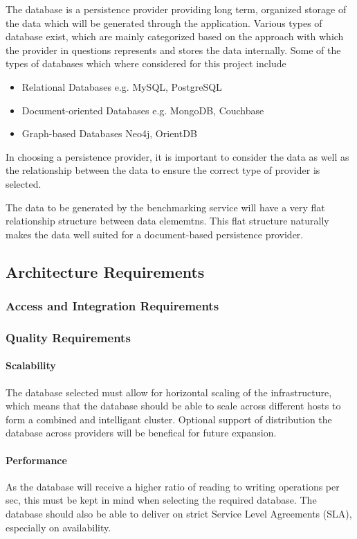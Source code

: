 The database is a persistence provider providing long term, organized storage
of the data which will be generated through the application. Various types of
database exist, which are mainly categorized based on the approach with which
the provider in questions represents and stores the data internally. Some of 
the types of databases which where considered for this project include
\begin{itemize}
	\item Relational Databases e.g. MySQL, PostgreSQL
	\item Document-oriented Databases e.g. MongoDB, Couchbase
	\item Graph-based Databases Neo4j, OrientDB
\end{itemize}

In choosing a persistence provider, it is important to consider the data as
well as the relationship between the data to ensure the correct type of 
provider is selected.

The data to be generated by the benchmarking service will have a very flat
relationship structure between data elememtns. This flat structure naturally
makes the data well suited for a document-based persistence provider.

\subsection{Architecture Requirements}
\subsubsection{Access and Integration Requirements}
\subsubsection{Quality Requirements}
\paragraph{Scalability}
The database selected must allow for horizontal scaling of the infrastructure,
which means that the database should be able to scale across different hosts to
form a combined and intelligant cluster. Optional support of distribution the
database across providers will be benefical for future expansion.

\paragraph{Performance}
As the database will receive a higher ratio of reading to writing operations
per sec, this must be kept in mind when selecting the required database. The
database should also be able to deliver on strict Service Level Agreements
(SLA), especially on availability.

